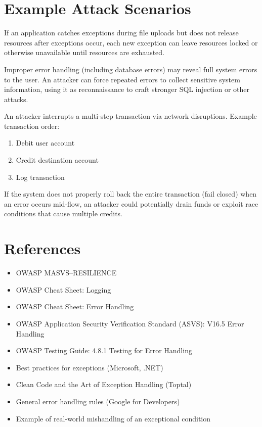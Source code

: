 \documentclass[11pt]{article}
\begin{document}
\section{Example Attack Scenarios}

\begin{scenario}
If an application catches exceptions during file uploads but does not release resources after exceptions occur, each new exception can leave resources locked or otherwise unavailable until resources are exhausted.
\end{scenario}

\begin{scenario}
Improper error handling (including database errors) may reveal full system errors to the user. An attacker can force repeated errors to collect sensitive system information, using it as reconnaissance to craft stronger SQL injection or other attacks.
\end{scenario}

\begin{scenario}
An attacker interrupts a multi-step transaction via network disruptions. Example transaction order:
\begin{enumerate}
  \item Debit user account
  \item Credit destination account
  \item Log transaction
\end{enumerate}
If the system does not properly roll back the entire transaction (fail closed) when an error occurs mid-flow, an attacker could potentially drain funds or exploit race conditions that cause multiple credits.
\end{scenario}

\section{References}
\begin{itemize}
  \item OWASP MASVS--RESILIENCE
  \item OWASP Cheat Sheet: Logging
  \item OWASP Cheat Sheet: Error Handling
  \item OWASP Application Security Verification Standard (ASVS): V16.5 Error Handling
  \item OWASP Testing Guide: 4.8.1 Testing for Error Handling
  \item Best practices for exceptions (Microsoft, .NET)
  \item Clean Code and the Art of Exception Handling (Toptal)
  \item General error handling rules (Google for Developers)
  \item Example of real-world mishandling of an exceptional condition
\end{itemize}
\end{document}
